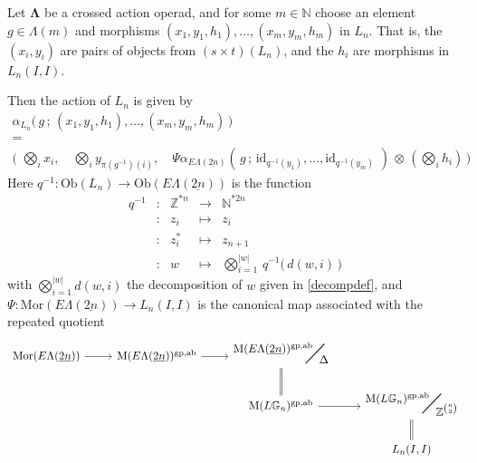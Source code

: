 \documentclass{amsbook} %
\newcommand{\id}{\textrm{id}}
\newcommand{\ML}{\mathbf{\Lambda}}
\newcommand{\bigquotient}[2]{ \raisebox{0.75\height}{$#1$} \mkern-12mu\scalebox{2}{$\diagup$}\mkern-10mu \raisebox{-0.5\height}{$#2$} }
\newcommand{\ELnn}{E\Lambda(\underline{2n})}
\numberwithin{section}{chapter}
\begin{document}
\begin{prop} \label{crossact} Let $\ML$ be a crossed action operad, and for some $m \in \mathbb{N}$ choose an element $g \in \Lambda(m)$ and morphisms $(x_1, y_1, h_1), \ldots, (x_m, y_m, h_m)$ in $L_n$. That is, the $(x_i, y_i)$ are pairs of objects from $(s \times t)(L_n)$, and the $h_i$ are morphisms in $L_n(I,I)$. 


Then the action of $L_n$ is given by
\[ \begin{array}{c}
			\alpha_{L_n}\big( \, g \, ; \, (x_1, y_1, h_1), \ldots, (x_m, y_m, h_m) \, \big) \\
			= \\
			\big( \, \, \bigotimes_i x_i, \quad \bigotimes_i y_{\pi(g^{-1})(i)}, \quad \Psi \alpha_{\ELnn}( \, g \, ; \, \id_{q^{-1}(y_1)}, \ldots, \id_{q^{-1}(y_m)} \, \, ) \, \otimes \, (\bigotimes_i h_i) \, \big) 
		\end{array}
\]
Here $q^{-1} \colon  \mathrm{Ob}(L_n) \to \mathrm{Ob}(\ELnn)$ is the function 
\[ \begin{array}{rcrcl}
			q^{-1} & \colon & \mathbb{Z}^{\ast n} & \to & \mathbb{N}^{\ast 2n} \\
			& \colon & z_i & \mapsto & z_i \\
			& \colon & z_i^* & \mapsto & z_{n+1} \\
			& \colon & w & \mapsto & \bigotimes_{i=1}^{|w|} \, q^{-1}\big( \, d(w, i) \, \big)
		\end{array}
\]
with $\bigotimes_{i=1}^{|w|} d(w, i)$ the decomposition of $w$ given in \cref{decompdef}, and $\Psi \colon  \mathrm{Mor}(\ELnn) \to L_n(I,I)$ is the canonical map associated with the repeated quotient
\[ \begin{tikzcd}
\mathrm{Mor}(\ELnn) \ar[r] & \mathrm{M}(\ELnn)^{\mathrm{gp}, \mathrm{ab}} \ar[r] & \bigquotient{\mathrm{M}(\ELnn)^{\mathrm{gp}, \mathrm{ab}}}{\Delta} \ar[d, equals] & \\
& & \mathrm{M}(L\mathbb{G}_{n})^{\mathrm{gp}, \mathrm{ab}} \ar[r] & \bigquotient{\mathrm{M}(L\mathbb{G}_{n})^{\mathrm{gp}, \mathrm{ab}}}{\mathbb{Z}^{{n}\choose{2}}} \ar[d, equals] \\
& & & L_n(I,I)
\end{tikzcd} \]
\end{prop} 
\end{document}
